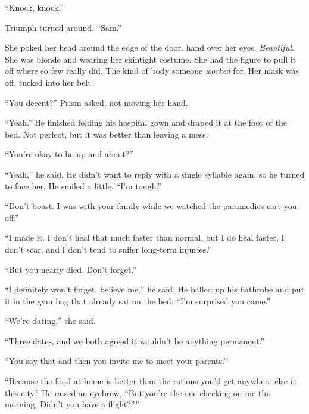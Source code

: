 





``Knock, knock.''



Triumph turned around.  ``Sam.''



She poked her head around the edge of the door, hand over her eyes.  \emph{Beautiful}.  She was blonde and wearing her skintight costume.  She had the figure to pull it off where so few really did.  The kind of body someone \emph{worked} for.  Her mask was off, tucked into her belt.



``You decent?''  Prism asked, not moving her hand.



``Yeah.''  He finished folding his hospital gown and draped it at the foot of the bed. Not perfect, but it was better than leaving a mess.



``You're okay to be up and about?''



``Yeah,'' he said.  He didn't want to reply with a single syllable again, so he turned to face her.  He smiled a little.  ``I'm tough.''



``Don't boast.  I was with your family while we watched the paramedics cart you off.''



``I made it.  I don't heal that much faster than normal, but I do heal faster, I don't scar, and I don't tend to suffer long-term injuries.''



``But you nearly died.  Don't forget.''



``I definitely won't forget, believe me,'' he said.  He balled up his bathrobe and put it in the gym bag that already sat on the bed.  ``I'm surprised you came.''



``We're dating,'' she said.



``Three dates, and we both agreed it wouldn't be anything permanent.''



``You say that and then you invite me to meet your parents.''



``Because the food at home is better than the rations you'd get anywhere else in this city.''  He raised an eyebrow, ``But you're the one checking on me this morning.  Didn't you have a flight?''''



